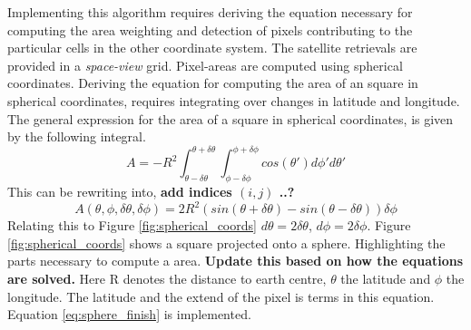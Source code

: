 Implementing this algorithm requires deriving the equation necessary for computing the area weighting and detection of pixels contributing to the particular cells in the other coordinate system. The satellite retrievals are provided in a \textit{space-view} grid. Pixel-areas are computed using spherical coordinates. Deriving the equation for computing the area of an square in spherical coordinates, requires integrating over changes in latitude and longitude. The general expression for the area of a square in spherical coordinates, is given by the following integral. 
\begin{equation} \label{eq:sphere_integral}
    A = -R^2\int_{ \theta - \delta \theta }^{\theta + \delta \theta} \int_{ \phi - \delta \phi }^{\phi + \delta \phi} cos\left( \theta' \right) d\phi' d\theta'
\end{equation}
This can be rewriting into, \textbf{add indices $(i, j)$ ..?}
\begin{equation} \label{eq:sphere_finish}
    A \left( \theta, \phi, \delta \theta, \delta \phi   \right)= 2R^2 \left( sin\left( \theta + \delta \theta  \right) - sin\left(  \theta - \delta \theta  \right) \right) \delta \phi
\end{equation}
Relating this to Figure \ref{fig:spherical_coords} $d \theta = 2 \delta \theta$, $d \phi = 2 \delta \phi$. Figure \ref{fig:spherical_coords} shows a square projected onto a sphere. Highlighting the parts necessary to compute a area. \textbf{Update this based on how the equations are solved.} Here R denotes the distance to earth centre, $\theta$ the latitude and $\phi$ the longitude. The latitude and the extend of the pixel is terms in this equation. Equation \ref{eq:sphere_finish} is implemented. 

